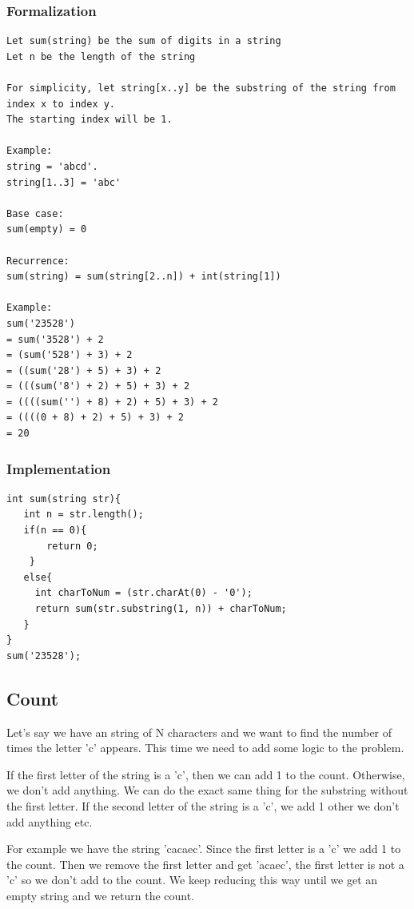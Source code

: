 \documentclass[11pt,oneside]{book}
\begin{document}
\subsubsection{Formalization}

\begin{lstlisting}
Let sum(string) be the sum of digits in a string
Let n be the length of the string

For simplicity, let string[x..y] be the substring of the string from index x to index y. 
The starting index will be 1.

Example: 
string = 'abcd'.
string[1..3] = 'abc'

Base case:
sum(empty) = 0

Recurrence:
sum(string) = sum(string[2..n]) + int(string[1])

Example:
sum('23528')
= sum('3528') + 2
= (sum('528') + 3) + 2
= ((sum('28') + 5) + 3) + 2
= (((sum('8') + 2) + 5) + 3) + 2
= ((((sum('') + 8) + 2) + 5) + 3) + 2
= ((((0 + 8) + 2) + 5) + 3) + 2
= 20
\end{lstlisting}

\subsubsection{Implementation}

\begin{lstlisting}
int sum(string str){
   int n = str.length();
   if(n == 0){
       return 0;
    }
   else{
     int charToNum = (str.charAt(0) - '0');
     return sum(str.substring(1, n)) + charToNum;
   }
}
sum('23528');
\end{lstlisting}

\subsection{Count}

Let's say we have an string of N characters and we want to find the number of times the letter 'c' appears. This time we need to add some logic to the problem.

If the first letter of the string is a 'c', then we can add 1 to the count. Otherwise, we don't add anything. We can do the exact same thing for the substring without the first letter. If the second letter of the string is a 'c', we add 1 other we don't add anything etc.

For example we have the string 'cacaec'. Since the first letter is a 'c' we add 1 to the count. Then we remove the first letter and get 'acaec', the first letter is not a 'c' so we don't add to the count. We keep reducing this way until we get an empty string and we return the count.
\end{document}
